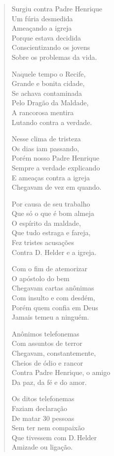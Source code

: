 \begin{verse}
Surgiu contra Padre Henrique\\
Um fúria desmedida\\
Ameaçando a igreja\\
Porque estava decidida\\
Conscientizando os jovens\\
Sobre os problemas da vida.

Naquele tempo o Recife,\\
Grande e bonita cidade,\\
Se achava contaminada\\
Pelo Dragão da Maldade,\\
A rancorosa mentira\\
Lutando contra a verdade.

Nesse clima de tristeza\\
Os dias iam passando,\\
Porém nosso Padre Henrique\\
Sempre a verdade explicando\\
E ameaças contra a igreja\\
Chegavam de vez em quando.

Por causa de seu trabalho\\
Que só o que é bom almeja\\
O espírito da maldade,\\
Que tudo estraga e fareja,\\
Fez tristes acusações\\
Contra D. Helder e a igreja.

Com o fim de atemorizar\\
O apóstolo do bem\\
Chegavam cartas anônimas\\
Com insulto e com desdém,\\
Porém quem confia em Deus\\
Jamais temeu a ninguém.

Anônimos telefonemas\\
Com assuntos de terror\\
Chegavam, constantemente,\\
Cheios de ódio e rancor\\
Contra Padre Henrique, o amigo\\
Da paz, da fé e do amor.

Os ditos telefonemas\\
Faziam declaração\\
De matar 30 pessoas\\
Sem ter nem compaixão\\
Que tivessem com D.\,Helder\\
Amizade ou ligação.


\end{verse}
